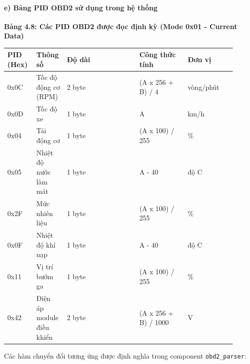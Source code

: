 \documentclass[13pt,a4paper]{extarticle}
\newcounter{none} %
\newcommand{\thesislongtableorignewline}{}
\let\thesislongtableorignewline\\
\renewcommand{\\}{\thesislongtableorignewline\hline}%
\let\\\thesislongtableorignewline
\newcommand{\thesistabletitle}[1]{%
  \begin{center}\textbf{#1}\end{center}%
}
\begin{document}
\paragraph{e) Bảng PID OBD2 sử dụng trong hệ
thống}\label{e-bux1ea3ng-pid-obd2-sux1eed-dux1ee5ng-trong-hux1ec7-thux1ed1ng}

\thesistabletitle{Bảng 4.8: Các PID OBD2 được đọc định kỳ (Mode 0x01 - Current
Data)}

{\def\LTcaptype{none} %
\begin{longtable}{|p{0.12\linewidth}|p{0.10\linewidth}|p{0.30\linewidth}|p{0.20\linewidth}|p{0.20\linewidth}|}
\hline \textbf{PID (Hex)} & \textbf{Thông số} & \textbf{Độ dài} & \textbf{Công thức tính} & \textbf{Đơn vị} \\
\hline
\endhead
\hline
\endlastfoot
0x0C & Tốc độ động cơ (RPM) & 2 byte & (A x 256 + B) / 4 & vòng/phút \\
0x0D & Tốc độ xe & 1 byte & A & km/h \\
0x04 & Tải động cơ & 1 byte & (A x 100) / 255 & \% \\
0x05 & Nhiệt độ nước làm mát & 1 byte & A - 40 & độ C \\
0x2F & Mức nhiên liệu & 1 byte & (A x 100) / 255 & \% \\
0x0F & Nhiệt độ khí nạp & 1 byte & A - 40 & độ C \\
0x11 & Vị trí bướm ga & 1 byte & (A x 100) / 255 & \% \\
0x42 & Điện áp module điều khiển & 2 byte & (A x 256 + B) / 1000 & V \\
\end{longtable}
}

Các hàm chuyển đổi tương ứng được định nghĩa trong component
\texttt{obd2\_parser}:
\end{document}

